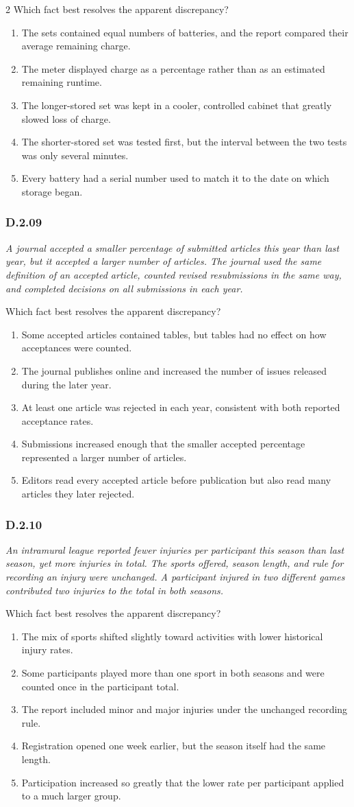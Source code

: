 \documentclass[10pt]{extarticle}
\newcommand{\choice}[1]{\item #1}
\newcommand{\bankitem}[1]{\subsubsection*{#1}}
\begin{document}
\begin{multicols}{2}
Which fact best resolves the apparent discrepancy?
\begin{enumerate}[label=(\alph*)]
  \choice{The sets contained equal numbers of batteries, and the report compared their average remaining charge.}
  \choice{The meter displayed charge as a percentage rather than as an estimated remaining runtime.}
  \choice{The longer-stored set was kept in a cooler, controlled cabinet that greatly slowed loss of charge.}
  \choice{The shorter-stored set was tested first, but the interval between the two tests was only several minutes.}
  \choice{Every battery had a serial number used to match it to the date on which storage began.}
\end{enumerate}
\bankitem{D.2.09}
\emph{A journal accepted a smaller percentage of submitted articles this year than last year, but it accepted a larger number of articles. The journal used the same definition of an accepted article, counted revised resubmissions in the same way, and completed decisions on all submissions in each year.}

Which fact best resolves the apparent discrepancy?
\begin{enumerate}[label=(\alph*)]
  \choice{Some accepted articles contained tables, but tables had no effect on how acceptances were counted.}
  \choice{The journal publishes online and increased the number of issues released during the later year.}
  \choice{At least one article was rejected in each year, consistent with both reported acceptance rates.}
  \choice{Submissions increased enough that the smaller accepted percentage represented a larger number of articles.}
  \choice{Editors read every accepted article before publication but also read many articles they later rejected.}
\end{enumerate}
\bankitem{D.2.10}
\emph{An intramural league reported fewer injuries per participant this season than last season, yet more injuries in total. The sports offered, season length, and rule for recording an injury were unchanged. A participant injured in two different games contributed two injuries to the total in both seasons.}

Which fact best resolves the apparent discrepancy?
\begin{enumerate}[label=(\alph*)]
  \choice{The mix of sports shifted slightly toward activities with lower historical injury rates.}
  \choice{Some participants played more than one sport in both seasons and were counted once in the participant total.}
  \choice{The report included minor and major injuries under the unchanged recording rule.}
  \choice{Registration opened one week earlier, but the season itself had the same length.}
  \choice{Participation increased so greatly that the lower rate per participant applied to a much larger group.}
\end{enumerate}

\end{multicols}
\end{document}
